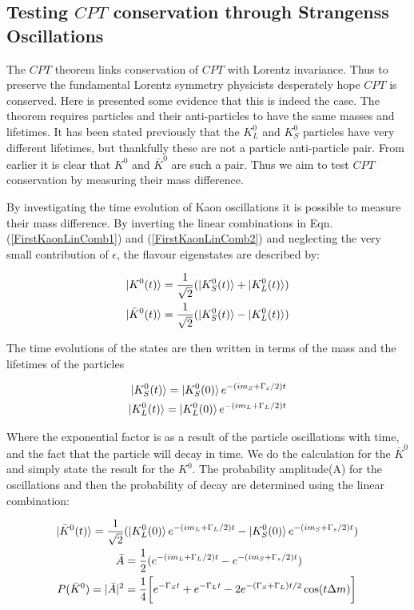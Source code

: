 \subsection{Testing $CPT$ conservation through Strangenss Oscillations}

The $CPT$ theorem links conservation of $CPT$ with Lorentz invariance. Thus to preserve the fundamental Lorentz symmetry physicists desperately hope $CPT$ is conserved. Here is presented some evidence that this is indeed the case. The theorem requires particles and their anti-particles to have the same masses and lifetimes. It has been stated previously that the $K^{0}_{L}$ and $K^{0}_{S}$ particles have very different lifetimes, but thankfully these are not a particle anti-particle pair. From earlier it is clear that $K^{0}$ and $\bar{K}^{0}$ are such a pair. Thus we aim to test $CPT$ conservation by measuring their mass difference.    

By investigating the time evolution of Kaon oscillations it is possible to measure their mass difference. By inverting the linear combinations in Eqn.(\ref{FirstKaonLinComb1}) and (\ref{FirstKaonLinComb2}) and neglecting the very small contribution of $\epsilon$, the flavour eigenstates are described by:

\begin{align*}
\ket{K^{0}(t)} = \frac{1}{\sqrt{2}} (\ket{K^{0}_{S}(t)} + \ket{K^{0}_{L}(t)}) \\
\ket{\bar{K}^{0}(t)}= \frac{1}{\sqrt{2}} (\ket{K^{0}_{S}(t)} - \ket{K^{0}_{L}(t)})
\end{align*} 

\noindent The time evolutions of the states are then written in terms of the mass and the lifetimes of the particles

\begin{align*}
\ket{K^{0}_{S}(t)} = \ket{K^{0}_{S}(0)} e^{-(im_{S}+\Gamma_{s}/2)t} \\
\ket{K^{0}_{L}(t)} = \ket{K^{0}_{L}(0)} e^{-(im_{L}+\Gamma_{L}/2)t} 
\end{align*} 

\noindent Where the exponential factor is as a result of the particle oscillations with time, and the fact that the particle will decay in time. We do the calculation for the $\bar{K}^{0}$ and simply state the result for the $K^{0}$. The probability amplitude(A) for the oscillations and then the probability of decay are determined using the linear combination:

\begin{align}
\ket{\bar{K}^{0}(t)} = \frac{1}{\sqrt{2}} & (\ket{K^{0}_{L}(0)} e^{-(im_{L}+\Gamma_{L}/2)t} - \ket{K^{0}_{S}(0)} e^{-(im_{S}+\Gamma_{s}/2)t}) \\
\bar{A} & = \frac{1}{2} (e^{-(im_{L}+\Gamma_{L}/2)t} - e^{-(im_{S}+\Gamma_{s}/2)t}) \\
\label{StrangenessOscillations1}
P(\bar{K}^{0}) = |\bar{A}|^{2} & = \frac{1}{4} \bigg[ e^{-\Gamma_{S}t} + e^{-\Gamma_{L}t} -2 e^{-(\Gamma_{S} + \Gamma_{L})t/2} \cos(t \Delta m )\bigg] \\
\end{align}

